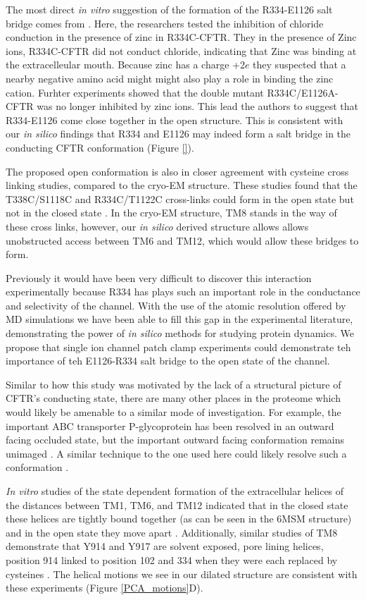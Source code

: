 The most direct \textit{in vitro} suggestion of the formation of the R334-E1126 salt bridge comes from \cite{wang2016}. Here, the researchers tested the inhibition of chloride conduction in the presence of zinc in R334C-CFTR. They in the presence of Zinc ions, R334C-CFTR did not conduct chloride, indicating that Zinc was binding at the extracelleular mouth. Because zinc has a charge +2$e$ they suspected that a nearby negative amino acid might might also play a role in binding the zinc cation. Furhter experiments showed that the double mutant R334C/E1126A-CFTR was no longer inhibited by zinc ions. This lead the authors to suggest that R334-E1126 come close together in the open structure. This is consistent with our \textit{in silico} findings that R334 and E1126 may indeed form a salt bridge in the conducting CFTR conformation (Figure \ref{}).  

The proposed open conformation is also in closer agreement with cysteine cross linking studies, compared to the cryo-EM structure. These studies found that the T338C/S1118C and R334C/T1122C cross-links could form in the open state but not in the closed state \cite{wang2012}. In the cryo-EM structure, TM8 stands in the way of these cross links, however, our \textit{in silico} derived structure allows allows unobstructed access between TM6 and TM12, which would allow these bridges to form.

Previously it would have been very difficult to discover this interaction experimentally because R334 has plays such an important role in the conductance and selectivity of the channel. With the use of the atomic resolution offered by MD simulations we have been able to fill this gap in the experimental literature, demonstrating the power of \textit {in silico} methods for studying protein dynamics. We propose that single ion channel patch clamp experiments could demonstrate teh importance of teh E1126-R334 salt bridge to the open state of the channel. 

Similar to how this study was motivated by the lack of a structural picture of CFTR's conducting state, there are many other places in the proteome which would likely be amenable to a similar mode of investigation. For example, the important ABC transporter P-glycoprotein has been resolved in an outward facing occluded state, but the important outward facing conformation remains unimaged \cite{kim2018}. A similar technique to the one used here could likely resolve such a conformation \cite{kim2018a}.

\textit {In vitro} studies of the state dependent formation of the extracellular helices of the distances between  TM1, TM6, and TM12 indicated that in the closed state these helices are tightly bound together (as can be seen in the 6MSM structure) and in the open state they move apart \cite{negoda2018}. Additionally, similar studies of TM8 demonstrate that Y914 and Y917 are solvent exposed, pore lining helices, position 914 linked to position 102 and 334 when they were each replaced by cysteines \cite{negoda2019}. The helical motions we see in our dilated structure are consistent with these experiments (Figure \ref{PCA_motions}D). 

